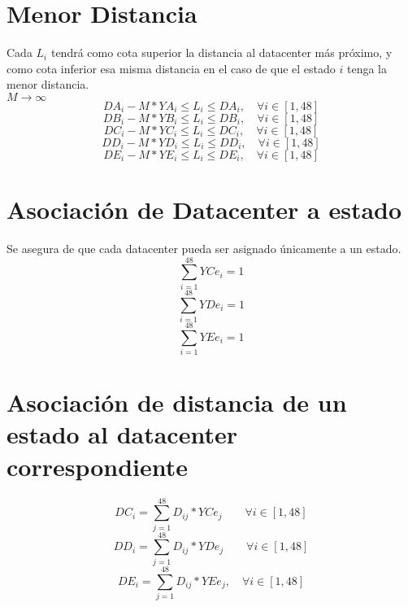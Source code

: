 \documentclass{article}
\begin{document}
\section{Menor Distancia}
Cada $L_i$ tendr\'a como cota superior la distancia al datacenter m\'as pr\'oximo, y como cota inferior esa misma distancia en el caso de que el estado $i$ tenga la menor distancia.\\
$M \rightarrow \infty$
\begin{equation}
DA_{i} - M * YA_{i} \leq L_{i} \leq DA_{i}, \quad \forall i \in [1, 48]
\end{equation}
\begin{equation}
DB_{i} - M * YB_{i} \leq L_{i} \leq DB_{i}, \quad \forall i \in [1, 48]
\end{equation}
\begin{equation}
DC_{i} - M * YC_{i} \leq L_{i} \leq DC_{i}, \quad \forall i \in [1, 48]
\end{equation}
\begin{equation}
DD_{i} - M * YD_{i} \leq L_{i} \leq DD_{i}, \quad \forall i \in [1, 48]
\end{equation}
\begin{equation}
DE_{i} - M * YE_{i} \leq L_{i} \leq DE_{i}, \quad \forall i \in [1, 48]
\end{equation}

\section{Asociaci\'on de Datacenter a estado}
Se asegura de que cada datacenter pueda ser asignado \'unicamente a un estado.
\begin{equation}
\sum_{i=1}^{48} YCe_{i}  = 1 
\end{equation}
\begin{equation}
\sum_{i=1}^{48} YDe_{i}  = 1
\end{equation}
\begin{equation}
\sum_{i=1}^{48} YEe_{i}  = 1
\end{equation}

\section{Asociaci\'on de distancia de un estado al datacenter correspondiente}
\begin{equation}
	DC_{i} = \sum_{j=1}^{48} D_{ij} * YCe_{j} \qquad \forall i \in [1, 48]
\end{equation}
\begin{equation}
	DD_{i} = \sum_{j=1}^{48} D_{ij} * YDe_{j} \qquad \forall i \in [1, 48]
\end{equation}
\begin{equation}
DE_{i} = 
\sum_{j=1}^{48} D_{ij} * YEe_{j}, \quad \forall i \in [1, 48]
\end{equation}
\end{document}
